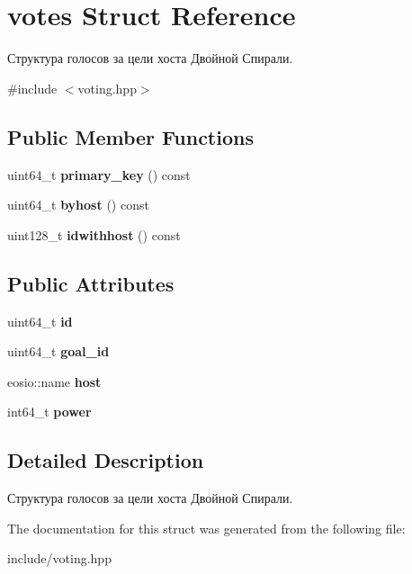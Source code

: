 \hypertarget{structvotes}{}\section{votes Struct Reference}
\label{structvotes}


Структура голосов за цели хоста Двойной Спирали.  




{\ttfamily \#include $<$voting.\+hpp$>$}

\subsection*{Public Member Functions}
\begin{DoxyCompactItemize}
\item 
\mbox{\label{structvotes_a7e45203e8e17bd3321915a38edfc936e}} 
uint64\+\_\+t {\bfseries primary\+\_\+key} () const
\item 
\mbox{\label{structvotes_a9a9364ba8ca4789b5b91af3f0d0a1803}} 
uint64\+\_\+t {\bfseries byhost} () const
\item 
\mbox{\label{structvotes_ac66dd6322d7aead5f453001d9410f238}} 
uint128\+\_\+t {\bfseries idwithhost} () const
\end{DoxyCompactItemize}
\subsection*{Public Attributes}
\begin{DoxyCompactItemize}
\item 
\mbox{\label{structvotes_aa3e80b46ca3e30af1ecd42323adeb2d3}} 
uint64\+\_\+t {\bfseries id}
\item 
\mbox{\label{structvotes_a1b7b64166bd63d0edb024401ddba2615}} 
uint64\+\_\+t {\bfseries goal\+\_\+id}
\item 
\mbox{\label{structvotes_a3e9666701df6922b45727fce90a9cfae}} 
eosio\+::name {\bfseries host}
\item 
\mbox{\label{structvotes_a61a8b9a9f031e027b6ab7da38bd7c00f}} 
int64\+\_\+t {\bfseries power}
\end{DoxyCompactItemize}


\subsection{Detailed Description}
Структура голосов за цели хоста Двойной Спирали. 

The documentation for this struct was generated from the following file\+:\begin{DoxyCompactItemize}
\item 
include/voting.\+hpp\end{DoxyCompactItemize}
